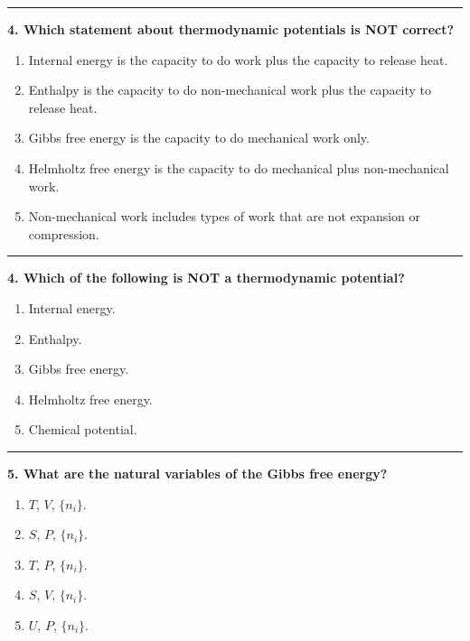 \documentclass[
  9pt,
]{extbook}
\providecommand{\tightlist}{%
  \setlength{\itemsep}{0pt}\setlength{\parskip}{0pt}}
\theoremstyle{definition}
\theoremstyle{definition}
\theoremstyle{definition}
\theoremstyle{definition}
\theoremstyle{remark}
\begin{document}
\begin{center}\rule{0.5\linewidth}{0.5pt}\end{center}

\textbf{4. Which statement about thermodynamic potentials is NOT correct?}

\begin{enumerate}
\def\labelenumi{\alph{enumi}.}
\tightlist
\item
  Internal energy is the capacity to do work plus the capacity to release heat.
\item
  Enthalpy is the capacity to do non-mechanical work plus the capacity to release heat.
\item
  Gibbs free energy is the capacity to do mechanical work only.
\item
  Helmholtz free energy is the capacity to do mechanical plus non-mechanical work.
\item
  Non-mechanical work includes types of work that are not expansion or compression.
\end{enumerate}

\begin{center}\rule{0.5\linewidth}{0.5pt}\end{center}

\textbf{4. Which of the following is NOT a thermodynamic potential?}

\begin{enumerate}
\def\labelenumi{\alph{enumi}.}
\tightlist
\item
  Internal energy.
\item
  Enthalpy.
\item
  Gibbs free energy.
\item
  Helmholtz free energy.
\item
  Chemical potential.
\end{enumerate}

\begin{center}\rule{0.5\linewidth}{0.5pt}\end{center}

\textbf{5. What are the natural variables of the Gibbs free energy?}

\begin{enumerate}
\def\labelenumi{\alph{enumi}.}
\tightlist
\item
  \(T\), \(V\), \(\{n_i\}\).
\item
  \(S\), \(P\), \(\{n_i\}\).
\item
  \(T\), \(P\), \(\{n_i\}\).
\item
  \(S\), \(V\), \(\{n_i\}\).
\item
  \(U\), \(P\), \(\{n_i\}\).
\end{enumerate}
\end{document}
